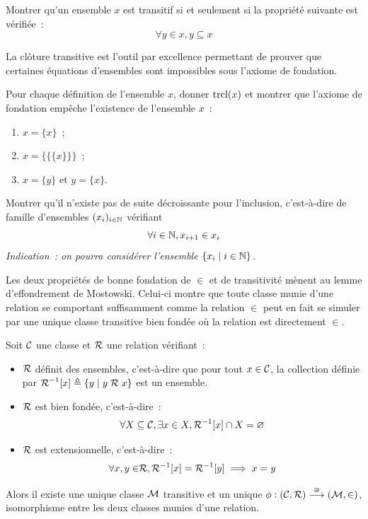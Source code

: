 \begin{exercise}
  Montrer qu'un ensemble $x$ est transitif si et seulement si la propriété
  suivante est vérifiée~:
  \[\forall y\in x, y\subseteq x\]
\end{exercise}

La clôture transitive est l'outil par excellence permettant de prouver que
certaines équations d'ensembles sont impossibles sous l'axiome de fondation.

\begin{exercise}
  Pour chaque définition de l'ensemble $x$, donner $\operatorname{trcl}(x)$ et montrer que
  l'axiome de fondation empêche l'existence de l'ensemble $x$~:
  \begin{enumerate}[label=(\roman*)]
  \item $x = \{x \}$~;
  \item $x = \{\{\{x \}\}\}$~;
  \item $x = \{y\}$ et $y = \{x\}$.
  \end{enumerate}

  Montrer qu'il n'existe pas de suite décroissante pour l'inclusion,
  c'est-à-dire de famille d'ensembles $(x_i)_{i \in \mathbb N}$ vérifiant
  \[\forall i \in \mathbb N, x_{i+1} \in x_i\]
  \textit{Indication~: on pourra considérer l'ensemble
    $\left\{ x_i \;\middle\vert\; i \in \mathbb N \right\}$.}
\end{exercise}

Les deux propriétés de bonne fondation de $\in$ et de transitivité mènent au
lemme d'effondrement de Mostowski. Celui-ci montre que toute classe munie d'une
relation se comportant suffisamment comme la relation $\in$ peut en fait se
simuler par une unique classe transitive bien fondée où la relation est
directement $\in$.

\begin{lemma}\label{lem.most}
  Soit $\mathcal{C}$ une classe et $\mathrel{\mathcal{R}}$ une relation vérifiant~:
  \begin{itemize}
  \item $\mathrel{\mathcal{R}}$ définit des ensembles, c'est-à-dire que pour tout $x\in\mathcal{C}$,
    la collection définie par $\mathord{\mathrel{\mathcal{R}}}^{-1}[x] \triangleq \left\{ y \;\middle\vert\; y \mathrel{\mathcal{R}} x \right\}$ est
    un ensemble.
  \item $\mathrel{\mathcal{R}}$ est bien fondée, c'est-à-dire~:
    \[\forall X\subseteq \mathcal{C}, \exists x \in X, \mathord{\mathrel{\mathcal{R}}}^{-1}[x]\cap X = \varnothing\]
  \item $\mathrel{\mathcal{R}}$ est extensionnelle, c'est-à-dire~:
    \[\forall x,y\in \mathrel{\mathcal{R}}, \mathord{\mathrel{\mathcal{R}}}^{-1}[x] = \mathord{\mathrel{\mathcal{R}}}^{-1}[y] \implies x = y\]
  \end{itemize}

  Alors il existe une unique classe $\mathcal{M}$ transitive et un unique
  $\phi : \displaystyle (\mathcal{C},\mathrel{\mathcal{R}}) \overset{\cong}{\longrightarrow} (\mathcal{M},\in)$, isomorphisme entre
  les deux classes munies d'une relation.
\end{lemma}

